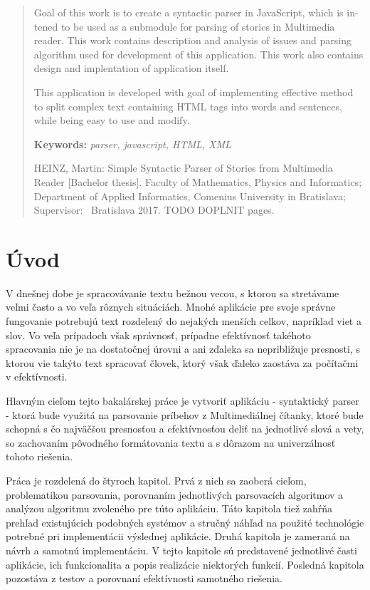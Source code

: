 \documentclass[12pt,a4paper]{report}
\theoremstyle{definition}
\theoremstyle{remark}
\begin{document}
\begin{otherlanguage}{english}
\begin{abstract}

Goal of this work is to create a syntactic parser in JavaScript, which is intened to be used as a submodule for parsing of stories in Multimedia reader. This work contains description and analysis of issues and parsing algorithm used for development of this application. This work also contains design and implentation of application itself.


This application is developed with goal of implementing effective method to split complex text containing HTML tags into words and sentences, while being easy to use and modify.

\bigskip\noindent
\textbf{Keywords:} \textit{parser, javascript, HTML, XML} 

\bigskip
HEINZ, Martin: Simple Syntactic Parser of Stories from Multimedia Reader [Bachelor thesis]. Faculty of Mathematics, Physics and Informatics;
Department of Applied Informatics, Comenius University in Bratislava; Supervisor: \skolitel \ Bratislava 2017. TODO DOPLNIT pages.

\end{abstract}
\end{otherlanguage}
\setcounter{tocdepth}{1}
\tableofcontents

\chapter*{Úvod}
V dnešnej dobe je spracovávanie textu bežnou vecou, s ktorou sa stretávame veľmi často a vo veľa rôznych situáciách. Mnohé aplikácie pre svoje správne fungovanie potrebujú text rozdelený do nejakých menších celkov, napríklad viet a slov. Vo veľa prípadoch však správnosť, prípadne efektívnosť takéhoto spracovania nie je na dostatočnej úrovni a ani zďaleka sa nepribližuje presnosti, s ktorou vie takýto text spracovať človek, ktorý však ďaleko zaostáva za počítačmi v efektívnosti.
\bigskip


Hlavným cieľom tejto bakalárskej práce je vytvoriť aplikáciu  - syntaktický parser - ktorá bude využitá na parsovanie príbehov z Multimediálnej čítanky, ktoré bude schopná s čo najväčšou presnosťou a efektívnosťou deliť na jednotlivé slová a vety, so zachovaním pôvodného formátovania textu a s dôrazom na univerzálnosť tohoto riešenia.
\bigskip


Práca je rozdelená do štyroch kapitol. Prvá z nich sa zaoberá cieľom, problematikou parsovania, porovnaním jednotlivých parsovacích algoritmov a analýzou algoritmu zvoleného pre túto aplikáciu. Táto kapitola tiež zahŕňa prehľad existujúcich podobných systémov a stručný náhľad na použité technológie potrebné pri implementácii výslednej aplikácie. Druhá kapitola je zameraná na návrh a samotnú implementáciu. V tejto kapitole sú predstavené jednotlivé časti aplikácie, ich funkcionalita a popis realizácie niektorých funkcií. Posledná kapitola pozostáva z testov a porovnaní  efektívnosti samotného riešenia.
\bigskip
\end{document}
